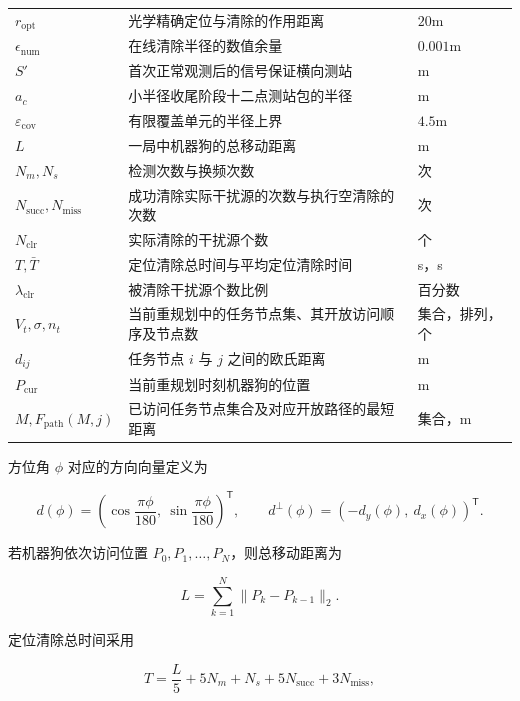 \begin{longtable}{@{}>{\small}p{}>{\small}p{}>{\small}p{}@{}}
$r_{\mathrm{opt}}$ & 光学精确定位与清除的作用距离 & $20\mathrm{m}$ \\
$\epsilon_{\mathrm{num}}$ & 在线清除半径的数值余量 & $0.001\mathrm{m}$ \\
$S'$ & 首次正常观测后的信号保证横向测站 & m \\
$a_c$ & 小半径收尾阶段十二点测站包的半径 & m \\
$\varepsilon_{\mathrm{cov}}$ & 有限覆盖单元的半径上界 & $4.5\mathrm{m}$ \\
$L$ & 一局中机器狗的总移动距离 & m \\
$N_m,N_s$ & 检测次数与换频次数 & 次 \\
$N_{\mathrm{succ}},N_{\mathrm{miss}}$ & 成功清除实际干扰源的次数与执行空清除的次数 & 次 \\
$N_{\mathrm{clr}}$ & 实际清除的干扰源个数 & 个 \\
$T,\bar T$ & 定位清除总时间与平均定位清除时间 & s，s \\
$\lambda_{\mathrm{clr}}$ & 被清除干扰源个数比例 & 百分数 \\
$V_t,\sigma,n_t$ & 当前重规划中的任务节点集、其开放访问顺序及节点数 & 集合，排列，个 \\
$d_{ij}$ & 任务节点 $i$ 与 $j$ 之间的欧氏距离 & m \\
$P_{\mathrm{cur}}$ & 当前重规划时刻机器狗的位置 & m \\
$M,F_{\mathrm{path}}(M,j)$ & 已访问任务节点集合及对应开放路径的最短距离 & 集合，m \\
\bottomrule
\end{longtable}

方位角 $\phi$ 对应的方向向量定义为

\begin{equation}
d(\phi)=\left(\cos\frac{\pi\phi}{180},\ \sin\frac{\pi\phi}{180}\right)^{\mathsf T},
\qquad
d^{\perp}(\phi)=(-d_y(\phi),\ d_x(\phi))^{\mathsf T}.
\label{eq:q3_direction}
\end{equation}

若机器狗依次访问位置 $P_0,P_1,\ldots,P_N$，则总移动距离为

\begin{equation}
L=\sum_{k=1}^{N}\lVert P_k-P_{k-1}\rVert_2.
\label{eq:q3_distance}
\end{equation}

定位清除总时间采用

\begin{equation}
T=\frac{L}{5}+5N_m+N_s+5N_{\mathrm{succ}}+3N_{\mathrm{miss}},
\label{eq:q3_total_time}
\end{equation}

